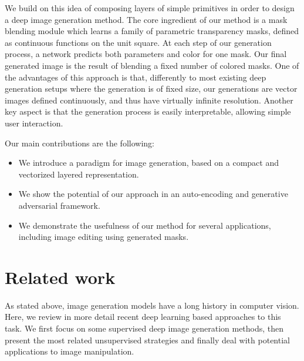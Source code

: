 \documentclass[10pt,twocolumn,letterpaper]{article}
\begin{document}
We build on this idea of composing layers of simple primitives in order to design a deep image generation method. The core ingredient of our method is a mask blending module which learns a family of parametric transparency masks, defined as continuous functions on the unit square. %
At each step of our generation process, a network predicts both parameters and color for one mask. Our final generated image is the result of blending a fixed number of colored masks. One of the advantages of this approach is that, differently to most existing deep generation setups where the generation is of fixed size, our generations are vector images defined continuously, and thus have virtually infinite resolution. Another key aspect is that the generation process is easily interpretable, allowing simple user interaction. %


Our main contributions are the following:
\begin{itemize}
    \item We introduce a paradigm for image generation, based on a compact and vectorized layered representation.
    \item We show the potential of our approach in an auto-encoding and generative adversarial framework.%
    \item We demonstrate the usefulness of our method for several applications, including image editing using generated masks.%
\end{itemize}
    
\section{Related work}

As stated above, image generation models have a long history in computer vision. Here, we review in more detail recent deep learning based approaches to this task.
We first focus on some supervised deep image generation methods, then present the most related unsupervised strategies and finally deal with potential applications to image manipulation.
\end{document}
